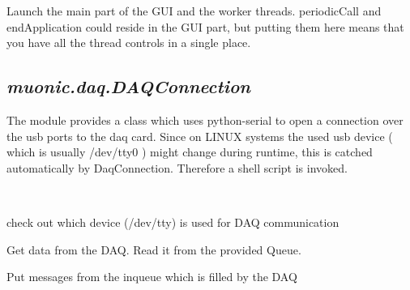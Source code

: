 \documentclass[letterpaper,10pt,english]{sphinxmanual}
\begin{document}
\begin{fulllineitems}
\label{muonic:muonic.daq.DAQProvider.DAQProvider}
Launch the main part of the GUI and the worker threads. periodicCall and
endApplication could reside in the GUI part, but putting them here
means that you have all the thread controls in a single place.

\end{fulllineitems}



\subsection{\emph{muonic.daq.DAQConnection}}
\label{muonic:muonic-daq-daqconnection}
The module provides a class which uses python-serial to open a connection over the usb ports to the daq card. Since on LINUX systems the used usb device ( which is usually /dev/tty0 ) might change during runtime, this is catched automatically by DaqConnection. Therefore a shell script is invoked.
\label{muonic:module-muonic.daq.DaqConnection}

\begin{fulllineitems}
\label{muonic:muonic.daq.DaqConnection.DaqConnection}~

\begin{fulllineitems}
\label{muonic:muonic.daq.DaqConnection.DaqConnection.get_port}
check out which device (/dev/tty) is used for DAQ communication

\end{fulllineitems}


\begin{fulllineitems}
\label{muonic:muonic.daq.DaqConnection.DaqConnection.read}
Get data from the DAQ. Read it from the provided Queue.

\end{fulllineitems}


\begin{fulllineitems}
\label{muonic:muonic.daq.DaqConnection.DaqConnection.write}
Put messages from the inqueue which is filled by the DAQ

\end{fulllineitems}


\end{fulllineitems}
\end{document}
